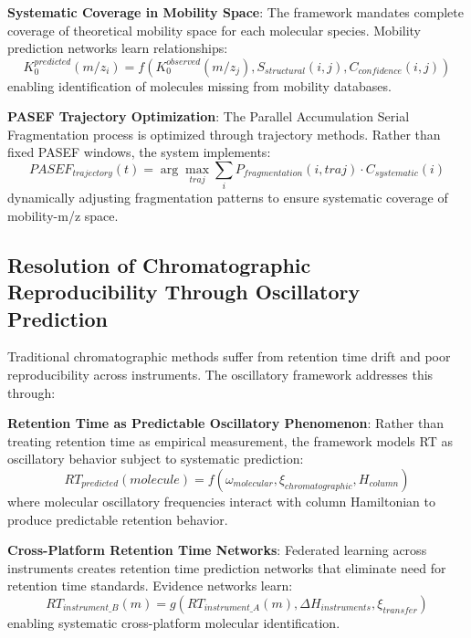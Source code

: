 \documentclass[11pt,a4paper]{article}
\begin{document}
\textbf{Systematic Coverage in Mobility Space}: The framework mandates complete coverage of theoretical mobility space for each molecular species. Mobility prediction networks learn relationships:
\begin{equation}
K_0^{predicted}(m/z_i) = f(K_0^{observed}(m/z_j), S_{structural}(i,j), C_{confidence}(i,j))
\end{equation}
enabling identification of molecules missing from mobility databases.

\textbf{PASEF Trajectory Optimization}: The Parallel Accumulation Serial Fragmentation process is optimized through trajectory methods. Rather than fixed PASEF windows, the system implements:
\begin{equation}
PASEF_{trajectory}(t) = \arg\max_{traj} \sum_{i} P_{fragmentation}(i, traj) \cdot C_{systematic}(i)
\end{equation}
dynamically adjusting fragmentation patterns to ensure systematic coverage of mobility-m/z space.

\subsection{Resolution of Chromatographic Reproducibility Through Oscillatory Prediction}

Traditional chromatographic methods suffer from retention time drift and poor reproducibility across instruments. The oscillatory framework addresses this through:

\textbf{Retention Time as Predictable Oscillatory Phenomenon}: Rather than treating retention time as empirical measurement, the framework models RT as oscillatory behavior subject to systematic prediction:
\begin{equation}
RT_{predicted}(molecule) = f(\omega_{molecular}, \xi_{chromatographic}, H_{column})
\end{equation}
where molecular oscillatory frequencies interact with column Hamiltonian to produce predictable retention behavior.

\textbf{Cross-Platform Retention Time Networks}: Federated learning across instruments creates retention time prediction networks that eliminate need for retention time standards. Evidence networks learn:
\begin{equation}
RT_{instrument\_B}(m) = g(RT_{instrument\_A}(m), \Delta H_{instruments}, \xi_{transfer})
\end{equation}
enabling systematic cross-platform molecular identification.
\end{document}
